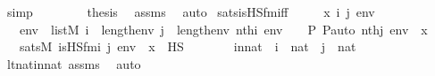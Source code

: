 \begin{isabellebody}
\ simp\isanewline
\ \ \isamarkupfalse%
\isanewline
\ \ \isamarkupfalse%
\ \isamarkupfalse%
\ {\isacharquery}{\kern0pt}thesis\ \isamarkupfalse%
\ assms\ \isamarkupfalse%
\ auto\isanewline
{}\isamarkupfalse%
%
\endisatagproof
{\isafoldproof}%
%
\isadelimproof
\isanewline
%
\endisadelimproof
\isanewline
{}\isamarkupfalse%
\ sats{\isacharunderscore}{\kern0pt}is{\isacharunderscore}{\kern0pt}HS{\isacharunderscore}{\kern0pt}fm{\isacharunderscore}{\kern0pt}iff\ {\isacharcolon}{\kern0pt}\ \isanewline
\ \ \ x\ i\ j\ env\ \isanewline
\ \ \ {\isachardoublequoteopen}env\ {\isasymin}\ list{\isacharparenleft}{\kern0pt}M{\isacharparenright}{\kern0pt}{\isachardoublequoteclose}\ {\isachardoublequoteopen}i\ {\isacharless}{\kern0pt}\ length{\isacharparenleft}{\kern0pt}env{\isacharparenright}{\kern0pt}{\isachardoublequoteclose}\ {\isachardoublequoteopen}j\ {\isacharless}{\kern0pt}\ length{\isacharparenleft}{\kern0pt}env{\isacharparenright}{\kern0pt}{\isachardoublequoteclose}\ {\isachardoublequoteopen}nth{\isacharparenleft}{\kern0pt}i{\isacharcomma}{\kern0pt}\ env{\isacharparenright}{\kern0pt}\ {\isacharequal}{\kern0pt}\ {\isacharless}{\kern0pt}{\isasymF}{\isacharcomma}{\kern0pt}\ {\isasymG}{\isacharcomma}{\kern0pt}\ P{\isacharcomma}{\kern0pt}\ P{\isacharunderscore}{\kern0pt}auto{\isachargreater}{\kern0pt}{\isachardoublequoteclose}\ {\isachardoublequoteopen}nth{\isacharparenleft}{\kern0pt}j{\isacharcomma}{\kern0pt}\ env{\isacharparenright}{\kern0pt}\ {\isacharequal}{\kern0pt}\ x{\isachardoublequoteclose}\ \isanewline
\ \ \ {\isachardoublequoteopen}sats{\isacharparenleft}{\kern0pt}M{\isacharcomma}{\kern0pt}\ is{\isacharunderscore}{\kern0pt}HS{\isacharunderscore}{\kern0pt}fm{\isacharparenleft}{\kern0pt}i{\isacharcomma}{\kern0pt}\ j{\isacharparenright}{\kern0pt}{\isacharcomma}{\kern0pt}\ env{\isacharparenright}{\kern0pt}\ {\isasymlongleftrightarrow}\ x\ {\isasymin}\ HS{\isachardoublequoteclose}\ \isanewline
%
\isadelimproof
\isanewline
%
\endisadelimproof
%
\isatagproof
{}\isamarkupfalse%
\ {\isacharminus}{\kern0pt}\ \isanewline
\ \ \isamarkupfalse%
\ innat\ {\isacharcolon}{\kern0pt}\ {\isachardoublequoteopen}i\ {\isasymin}\ nat\ {\isasymand}\ j\ {\isasymin}\ nat{\isachardoublequoteclose}\ \isamarkupfalse%
\ lt{\isacharunderscore}{\kern0pt}nat{\isacharunderscore}{\kern0pt}in{\isacharunderscore}{\kern0pt}nat\ assms\ \isamarkupfalse%
\ auto\ \isanewline

\end{isabellebody}
